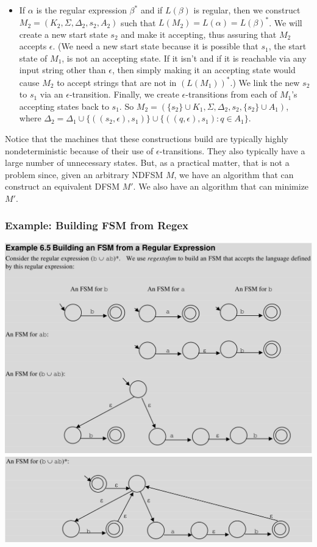 \documentclass[hidelinks,12pt]{article}
\begin{document}
\begin{itemize}
    \item If $\alpha$ is the regular expression $\beta^*$ and if $L(\beta)$ is regular, then we construct
        $M_2 = (K_2, \Sigma, \Delta_2, s_2, A_2)$ such that $L(M_2) = L(\alpha) = L(\beta)^*$. We will create a new
        start state $s_2$ and make it accepting, thus assuring that $M_2$ accepts $\epsilon$. (We need
        a new start state because it is possible that $s_1$, the start state of $M_1$, is not
        an accepting state. If it isn't and if it is reachable via any input string
        other than $\epsilon$, then simply making it an accepting state would cause $M_2$ to accept
        strings that are not in $(L(M_1))^*$.) We link the new $s_2$ to $s_1$ via an
        $\epsilon$-transition. Finally, we create $\epsilon$-transitions from each of $M_1$’s accepting
        states back to $s_1$. So $M_2 = (\{s_2\} \cup K_1, \Sigma, \Delta_2, s_2, \{s_2\} \cup A_1)$, where $\Delta_2 = \Delta_1 \cup
        \{((s_2, \epsilon), s_1)\} \cup \{((q, \epsilon), s_1) : q \in A_1\}$. 

\end{itemize}

Notice that the machines that these constructions build are typically highly
nondeterministic because of their use of $\epsilon$-transitions. They also typically
have a large number of unnecessary states. But, as a practical matter, that is
not a problem since, given an arbitrary NDFSM $M$, we have an algorithm that can
construct an equivalent DFSM $M'$. We also have an algorithm that can minimize $M'$.

\subsubsection{Example: Building FSM from Regex}

\includegraphics[width=\textwidth]{img/regextofsm1.png}
\includegraphics[width=\textwidth]{img/regextofsm2.png}
\end{document}
